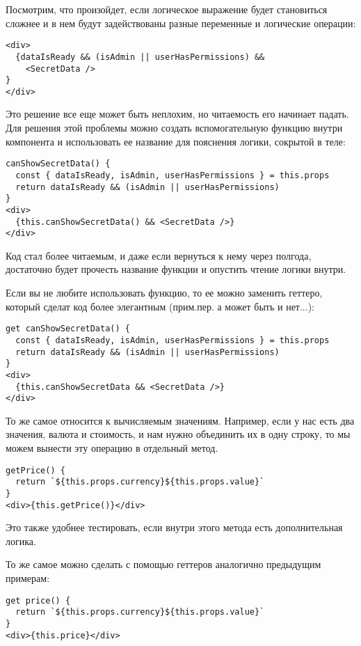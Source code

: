 \documentclass[12pt]{book}
\begin{document}
Посмотрим, что произойдет, если логическое выражение будет становиться сложнее и в нем будут задействованы разные переменные и логические операции:

\begin{lstlisting}
<div>
  {dataIsReady && (isAdmin || userHasPermissions) && 
    <SecretData />
}
</div>
\end{lstlisting}

Это решение все еще может быть неплохим, но читаемость его начинает падать. Для решения этой проблемы можно создать вспомогательную функцию внутри компонента и использовать ее название для пояснения логики, сокрытой в теле:

\begin{lstlisting}
canShowSecretData() {
  const { dataIsReady, isAdmin, userHasPermissions } = this.props
  return dataIsReady && (isAdmin || userHasPermissions)
}
<div>
  {this.canShowSecretData() && <SecretData />}
</div>
\end{lstlisting}

Код стал более читаемым, и даже если вернуться к нему через полгода, достаточно будет прочесть название функции и опустить чтение логики внутри.

Если вы не любите использовать функцию, то ее можно заменить геттеро, который сделат код более элегантным (прим.пер. а может быть и нет...):

\begin{lstlisting}
get canShowSecretData() {
  const { dataIsReady, isAdmin, userHasPermissions } = this.props
  return dataIsReady && (isAdmin || userHasPermissions)
}
<div>
  {this.canShowSecretData && <SecretData />}
</div>
\end{lstlisting}

То же самое относится к вычисляемым значениям. Например, если у нас есть два значения, валюта и стоимость, и нам нужно объединить их в одну строку, то мы можем вынести эту операцию в отдельный метод.

\begin{lstlisting}
getPrice() {
  return `${this.props.currency}${this.props.value}`
}
<div>{this.getPrice()}</div>
\end{lstlisting}

Это также удобнее тестировать, если внутри этого метода есть дополнительная логика.

То же самое можно сделать с помощью геттеров аналогично предыдущим примерам:

\begin{lstlisting}
get price() {
  return `${this.props.currency}${this.props.value}`
}
<div>{this.price}</div>
\end{lstlisting}
\end{document}
